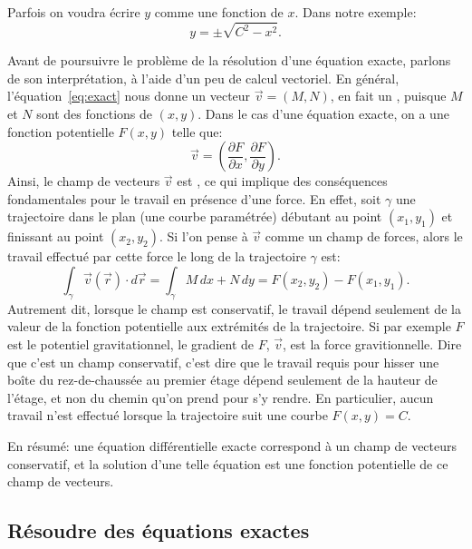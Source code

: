 Parfois on voudra écrire $y$ comme une fonction de $x$.  Dans notre exemple:
\begin{equation*}
	y = \pm \sqrt{C^2-x^2} .
\end{equation*}

Avant de poursuivre le problème de la résolution d'une équation exacte, parlons de son interprétation, à l'aide d'un peu de calcul vectoriel.
En général, l'équation~\eqref{eq:exact} nous donne un vecteur $\vec{v} = (M,N)$, en fait un \emph{},
puisque $M$ et $N$ sont des fonctions de $(x,y)$.
Dans le cas d'une équation exacte, on a une fonction potentielle $F(x,y)$ telle que:
\begin{equation*}
	\vec{v} = \left( \frac{\partial F}{\partial x} ,\frac{\partial F}{\partial y} \right) .
\end{equation*}
Ainsi, le champ de vecteurs $\vec{v}$ est \emph{},
ce qui implique des conséquences fondamentales pour le travail en présence d'une force.
En effet, soit $\gamma$ une trajectoire dans le plan (une courbe paramétrée) débutant au point $(x_1,y_1)$
et finissant au point $(x_2,y_2)$.
Si l'on pense à $\vec{v}$ comme un champ de forces, alors le travail effectué par cette force
le long de la trajectoire $\gamma$ est:
\begin{equation*}
	\int_\gamma \vec{v}(\vec{r}) \cdot d\vec{r}
	= \int_\gamma M \, dx + N \, dy
	= F(x_2,y_2) - F(x_1,y_1) .
\end{equation*}
Autrement dit, lorsque le champ est conservatif, le travail dépend seulement de la valeur de la fonction potentielle aux extrémités de la trajectoire.
Si par exemple $F$ est le potentiel gravitationnel, le gradient de $F$, $\vec{v}$, est la force gravitionnelle.
Dire que c'est un champ conservatif, c'est dire que le travail requis pour hisser une boîte du rez-de-chaussée au premier étage
dépend seulement de la hauteur de l'étage, et non du chemin qu'on prend pour s'y rendre.
En particulier, aucun travail n'est effectué lorsque la trajectoire suit une courbe $F(x,y) = C$.

En résumé: une équation différentielle exacte correspond à un champ de vecteurs conservatif,
et la solution d'une telle équation est une fonction potentielle de ce champ de vecteurs.


\subsection{Résoudre des équations exactes}

